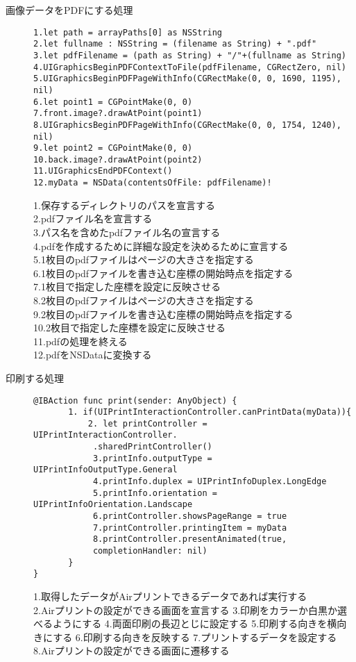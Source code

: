 \begin{description}
\item[画像データをPDFにする処理]\mbox{} 
\begin{lstlisting}[basicstyle=\ttfamily\footnotesize, frame=single]
1.let path = arrayPaths[0] as NSString
2.let fullname : NSString = (filename as String) + ".pdf"
3.let pdfFilename = (path as String) + "/"+(fullname as String)
4.UIGraphicsBeginPDFContextToFile(pdfFilename, CGRectZero, nil)
5.UIGraphicsBeginPDFPageWithInfo(CGRectMake(0, 0, 1690, 1195), nil)
6.let point1 = CGPointMake(0, 0)
7.front.image?.drawAtPoint(point1)
8.UIGraphicsBeginPDFPageWithInfo(CGRectMake(0, 0, 1754, 1240), nil)
9.let point2 = CGPointMake(0, 0)
10.back.image?.drawAtPoint(point2)
11.UIGraphicsEndPDFContext()
12.myData = NSData(contentsOfFile: pdfFilename)!
 \end{lstlisting}
1.保存するディレクトリのパスを宣言する\\
2.pdfファイル名を宣言する\\
3.パス名を含めたpdfファイル名の宣言する\\
4.pdfを作成するために詳細な設定を決めるために宣言する\\
5.1枚目のpdfファイルはページの大きさを指定する\\
6.1枚目のpdfファイルを書き込む座標の開始時点を指定する\\
7.1枚目で指定した座標を設定に反映させる\\
8.2枚目のpdfファイルはページの大きさを指定する\\
9.2枚目のpdfファイルを書き込む座標の開始時点を指定する\\
10.2枚目で指定した座標を設定に反映させる\\
11.pdfの処理を終える\\
12.pdfをNSDataに変換する\\
\item[印刷する処理]\mbox{} 
\begin{lstlisting}[basicstyle=\ttfamily\footnotesize, frame=single]
@IBAction func print(sender: AnyObject) {
       1. if(UIPrintInteractionController.canPrintData(myData)){
           2. let printController = UIPrintInteractionController.
            .sharedPrintController()
            3.printInfo.outputType = UIPrintInfoOutputType.General
            4.printInfo.duplex = UIPrintInfoDuplex.LongEdge
            5.printInfo.orientation = UIPrintInfoOrientation.Landscape
            6.printController.showsPageRange = true
            7.printController.printingItem = myData
            8.printController.presentAnimated(true, 
            completionHandler: nil)
       }
}
 \end{lstlisting}
 1.取得したデータがAirプリントできるデータであれば実行する\\
 2.Airプリントの設定ができる画面を宣言する
 3.印刷をカラーか白黒か選べるようにする
 4.両面印刷の長辺とじに設定する
 5.印刷する向きを横向きにする
 6.印刷する向きを反映する
 7.プリントするデータを設定する
 8.Airプリントの設定ができる画面に遷移する
\end{description}

